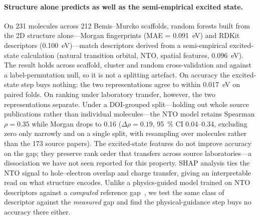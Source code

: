 \paragraph{Structure alone predicts as well as the semi-empirical excited state.}
On \num{231} molecules across \num{212} Bemis--Murcko scaffolds, random forests built
from the 2D structure alone---Morgan fingerprints (MAE = \qty{0.091}{\electronvolt}) and
RDKit descriptors (\qty{0.100}{\electronvolt})---match descriptors derived from a
semi-empirical excited-state calculation (natural transition orbital, NTO, spatial
features, \qty{0.096}{\electronvolt}). The result holds across scaffold, cluster and random
cross-validation and against a label-permutation null, so it is not a splitting
artefact. On accuracy the excited-state step buys nothing: the two representations
agree to within \qty{0.017}{\electronvolt} on paired folds. On ranking under
laboratory transfer, however, the two representations separate. Under a DOI-grouped
split---holding out whole source publications rather than individual
molecules---the NTO model retains Spearman $\rho = \num{0.35}$ while Morgan drops to
\num{0.16} ($\Delta\rho = \num{0.19}$, \qty{95}{\percent} CI
\numrange{0.04}{0.34}, excluding zero only narrowly and on a single split, with
resampling over molecules rather than the \num{173} source papers). The excited-state
features do not improve accuracy on the gap; they preserve rank order that transfers
across source laboratories---a dissociation we have not seen reported for this
property. SHAP analysis ties the NTO
signal to hole--electron overlap and charge transfer, giving an interpretable read on
what structure encodes. Unlike a physics-guided model trained on NTO descriptors
against a \emph{computed} reference gap~\cite{Das2025}, we test the same class of
descriptor against the \emph{measured} gap and find the physical-guidance step buys
no accuracy there either.

